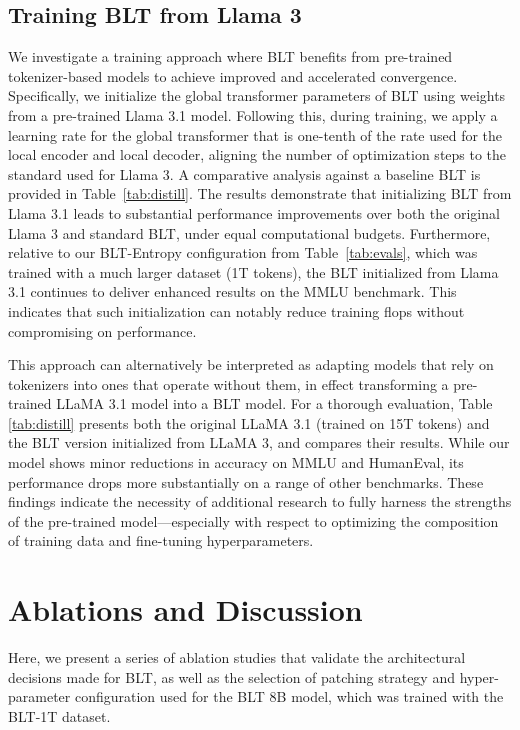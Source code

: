 \subsection{Training {\textsc BLT} from Llama 3}
\label{sec:distillation}
We investigate a training approach where {\textsc BLT} benefits from pre-trained tokenizer-based models to achieve improved and accelerated convergence. Specifically, we initialize the global transformer parameters of {\textsc BLT} using weights from a pre-trained Llama 3.1 model. Following this, during training, we apply a learning rate for the global transformer that is one-tenth of the rate used for the local encoder and local decoder, aligning the number of optimization steps to the standard used for Llama 3. A comparative analysis against a baseline {\textsc BLT} is provided in Table~\ref{tab:distill}. The results demonstrate that initializing {\textsc BLT} from Llama 3.1 leads to substantial performance improvements over both the original Llama 3 and standard {\textsc BLT}, under equal computational budgets. Furthermore, relative to our {\textsc BLT}-Entropy configuration from Table~\ref{tab:evals}, which was trained with a much larger dataset (1T tokens), the {\textsc BLT} initialized from Llama 3.1 continues to deliver enhanced results on the MMLU benchmark. This indicates that such initialization can notably reduce training flops without compromising on performance.

This approach can alternatively be interpreted as adapting models that rely on tokenizers into ones that operate without them, in effect transforming a pre-trained LLaMA 3.1 model into a {\textsc BLT} model. For a thorough evaluation, Table \ref{tab:distill} presents both the original LLaMA 3.1 (trained on 15T tokens) and the {\textsc BLT} version initialized from LLaMA 3, and compares their results. While our model shows minor reductions in accuracy on MMLU and HumanEval, its performance drops more substantially on a range of other benchmarks. These findings indicate the necessity of additional research to fully harness the strengths of the pre-trained model—especially with respect to optimizing the composition of training data and fine-tuning hyperparameters.

\section{Ablations and Discussion}
\label{section:ablations}
Here, we present a series of ablation studies that validate the architectural decisions made for {\textsc BLT}, as well as the selection of patching strategy and hyper-parameter configuration used for the {\textsc BLT} 8B model, which was trained with the {\textsc BLT}-1T dataset.

